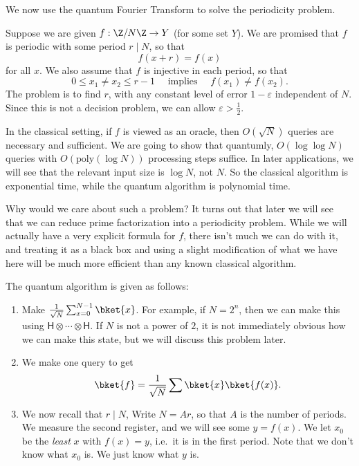 \documentclass[a4paper]{article}
\newcommand{\qH}{\mathsf{H}}
\begin{document}
We now use the quantum Fourier Transform to solve the periodicity problem.
\begin{eg}
  Suppose we are given $f: \Z/N\Z \to Y$ (for some set $Y$). We are promised that $f$ is periodic with some period $r \mid N$, so that
  \[
    f(x + r) = f(x)
  \]
  for all $x$. We also assume that $f$ is injective in each period, so that
  \[
    0 \leq x_1 \not= x_2 \leq r - 1\quad\text{ implies }\quad f(x_1) \not= f(x_2).
  \]
  The problem is to find $r$, with any constant level of error $1 - \varepsilon$ independent of $N$. Since this is not a decision problem, we can allow $\varepsilon > \frac{1}{2}$.

  In the classical setting, if $f$ is viewed as an oracle, then $O(\sqrt{N})$ queries are necessary and sufficient. We are going to show that quantumly, $O(\log \log N)$ queries with $O(\mathrm{poly}(\log N))$ processing steps suffice. In later applications, we will see that the relevant input size is $\log N$, not $N$. So the classical algorithm is exponential time, while the quantum algorithm is polynomial time.

  Why would we care about such a problem? It turns out that later we will see that we can reduce prime factorization into a periodicity problem. While we will actually have a very explicit formula for $f$, there isn't much we can do with it, and treating it as a black box and using a slight modification of what we have here will be much more efficient than any known classical algorithm.

  The quantum algorithm is given as follows:
  \begin{enumerate}
    \item Make $\frac{1}{\sqrt{N}} \sum_{x = 0}^{N - 1} \bket{x}$. For example, if $N = 2^n$, then we can make this using $\qH \otimes \cdots \otimes \qH$. If $N$ is not a power of $2$, it is not immediately obvious how we can make this state, but we will discuss this problem later.

    \item We make one query to get
      \[
        \bket{f} = \frac{1}{\sqrt{N}} \sum \bket{x} \bket{f(x)}.
      \]

    \item We now recall that $r \mid N$, Write $N = Ar$, so that $A$ is the number of periods. We measure the second register, and we will see some $y = f(x)$. We let $x_0$ be the \emph{least} $x$ with $f(x) = y$, i.e.\ it is in the first period. Note that we don't know what $x_0$ is. We just know what $y$ is.


\end{enumerate}
\end{eg}
\end{document}
